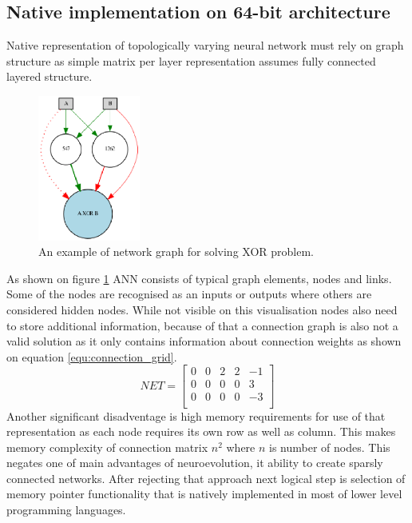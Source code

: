 \subsection{Native implementation on 64-bit architecture}
Native representation of topologically varying neural network must rely on graph structure as 
simple matrix per layer representation assumes fully connected layered structure.
\begin{figure}[htb] 
	\centering
	\includegraphics[width=0.3\textwidth]{figures/xor_network}
	\caption{An example of network graph for solving XOR problem.}
	\label{fig:xor_network}
\end{figure}
As shown on figure \ref{fig:xor_network} ANN consists of typical graph elements, 
nodes and links. Some of the nodes are recognised as an inputs or outputs where others are 
considered hidden nodes. While not visible on this visualisation nodes also need to store 
additional information, because of that a connection graph is also not a valid solution
as it only contains information about connection weights as shown on equation 
\ref{equ:connection_grid}.
\begin{equation}
	\label{equ:connection_grid}
	NET = \begin{bmatrix}
		0 & 0 & 2 & 2 & -1\\
		0 & 0 & 0 & 0 & 3\\
		0 & 0 & 0 & 0 & -3\\
	\end{bmatrix}
\end{equation}
Another significant disadventage is high memory requirements for use of that representation as 
each node requires its own row as well as column. This makes memory complexity of connection 
matrix $n^2$ where $n$ is number of nodes.
This negates one of main advantages of neuroevolution, it ability to create sparsly connected 
networks.
After rejecting that approach next logical step is selection of memory pointer functionality
that is natively implemented in most of lower level programming languages.
